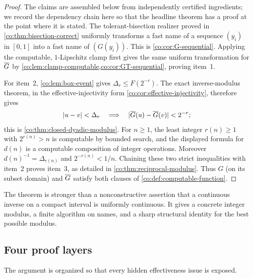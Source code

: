 \begin{proof}
The claims are assembled below from independently certified ingredients; we
record the dependency chain here so that the headline theorem has a proof at
the point where it is stated.  The tolerant-bisection realizer proved in
\cref{co:thm:bisection-correct} uniformly transforms a fast name of a sequence
$(y_i)$ in $[0,1]$ into a fast name of $(G(y_i))$.  This is
\cref{co:cor:G-sequential}.  Applying the computable, $1$-Lipschitz clamp first
gives the same uniform transformation for $\overline G$ by
\cref{co:lem:clamp-computable,co:cor:GT-sequential}, proving item~1.

For item~2, \cref{co:lem:box-event} gives
$\Delta_r\le F(2^{-r})$.  The exact inverse-modulus theorem, in the
effective-injectivity form \cref{co:cor:effective-injectivity}, therefore gives
\[
 |u-v|<\Delta_r\quad\Longrightarrow\quad
 |\overline G(u)-\overline G(v)|<2^{-r};
\]
this is \cref{co:thm:closed-dyadic-modulus}.  For $n\ge1$, the least integer
$r(n)\ge1$ with $2^{r(n)}>n$ is computable by bounded search, and the displayed
formula for $d(n)$ is a computable composition of integer operations.  Moreover
$d(n)^{-1}=\Delta_{r(n)}$ and $2^{-r(n)}<1/n$.  Chaining these two strict
inequalities with item~2 proves item~3, as detailed in
\cref{co:thm:reciprocal-modulus}.  Thus $G$ (on its subset domain) and $\overline G$
satisfy both clauses of \cref{co:def:computable-function}.
\end{proof}

The theorem is stronger than a nonconstructive assertion that a continuous
inverse on a compact interval is uniformly continuous.  It gives a concrete
integer modulus, a finite algorithm on names, and a sharp structural identity
for the best possible modulus.

\subsection{Four proof layers}

The argument is organized so that every hidden effectiveness issue is exposed.

